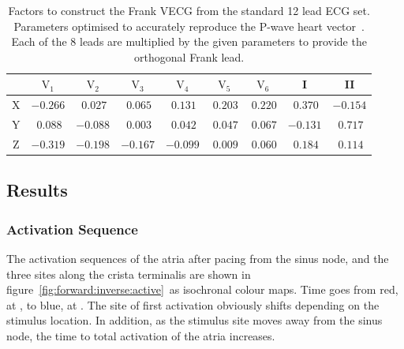 \begin{table}
\caption[Inverse Dower Factors]{
\label{tbl:forward:idparams}
Factors to construct the Frank VECG from the standard 12 lead ECG set.
Parameters optimised to accurately reproduce the P-wave heart
vector~\cite{Guillem2007}.
Each of the 8 leads are multiplied by the given parameters to provide the
orthogonal Frank lead.
}
\begin{center}
\begin{tabular}{c c c c c c c c c}
\toprule
& $\text{V}_{\text{1}}$ &$\text{V}_{\text{2}}$ & $\text{V}_{\text{3}}$ &
$\text{V}_{\text{4}}$ & $\text{V}_{\text{5}}$ & $\text{V}_{\text{6}}$ & I & II \\
\midrule
X & $-0.266$ & $\:0.027$ &  $\:0.065$ & $\:0.131$ & $\:0.203$ & $\:0.220$ & $\:0.370$ & $-0.154$ \\
Y & $\:0.088$ &  $-0.088$ & $\:0.003$ & $\:0.042$ & $\:0.047$ & $\:0.067$ & $-0.131$ & $\:0.717$ \\
Z & $-0.319$ & $-0.198$ & $-0.167$ & $-0.099$ & $\:0.009$ & $\:0.060$ & $\:0.184$ & $\:0.114$ \\
\bottomrule
\end{tabular}
\end{center}
\end{table}

\subsection{Results}

\subsubsection{Activation Sequence}

The activation sequences of the atria after pacing from the sinus node, and the
three sites along the crista terminalis are shown in
figure~\ref{fig:forward:inverse:active}\ as isochronal colour maps.
Time goes from red, at , to blue, at .
The site of first activation obviously shifts depending on the stimulus
location.
In addition, as the stimulus site moves away from the sinus node, the time to
total activation of the atria increases.

